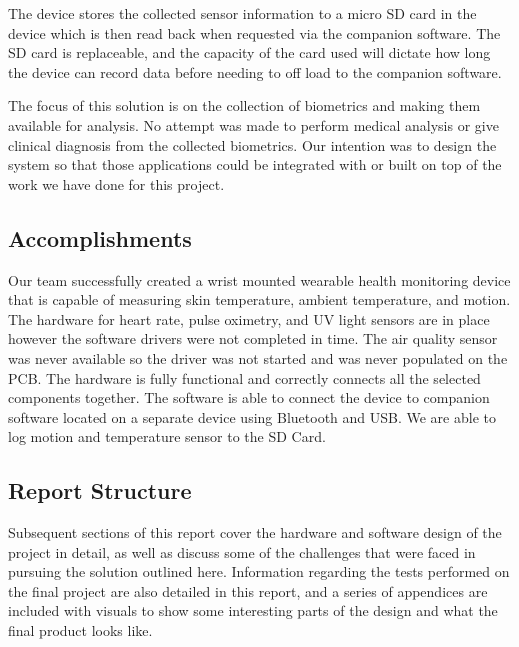 The device stores the collected sensor information to a micro SD card
in the device which is then read back when requested via the companion software.
The SD card is replaceable, and the capacity of the card used will dictate
how long the device can record data before needing to off load to the companion
software.

The focus of this solution is on the collection of biometrics and making them
available for analysis. No attempt was made to perform medical analysis
or give clinical diagnosis from the collected biometrics. Our intention was to
design the system so that those applications could be integrated with or built
on top of the work we have done for this project.



\subsection{Accomplishments}

Our team successfully created a wrist mounted wearable health monitoring device
that is capable of measuring skin temperature, ambient temperature, and motion.
The hardware for heart rate, pulse oximetry, and UV light sensors are in place
however the software drivers were not completed in time. 
The air quality sensor was never available so the driver was not started and was
never populated on the PCB. The hardware is fully functional and correctly
connects all the selected components together.  The software is able to connect
the device to companion software located on a separate device using Bluetooth
and USB.  We are able to log motion and temperature sensor to the SD Card.

\subsection{Report Structure}
Subsequent sections of this
report cover the hardware and software design of the project in detail, as well
as discuss some of the challenges that were faced in pursuing the solution
outlined here. Information regarding the tests performed on the final project
are also detailed in this report, and a series of appendices are included with
visuals to show some interesting parts of the design and what the final product
looks like.
